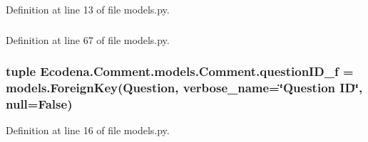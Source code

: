 Definition at line 13 of file models.py.

\hypertarget{class_ecodena_1_1_comment_1_1models_1_1_comment_a7185724458c06c0810da5aa79ddb222b}{
\subsubsection[{questionID\_\-f}]{}}
\label{d9/d86/class_ecodena_1_1_comment_1_1models_1_1_comment_a7185724458c06c0810da5aa79ddb222b}


Definition at line 67 of file models.py.

\hypertarget{class_ecodena_1_1_comment_1_1models_1_1_comment_a2c6b11a35fd421d384666c0b79a20c47}{
\subsubsection[{questionID\_\-f}]{\setlength{\rightskip}{0pt plus 5cm}tuple {\bf Ecodena.Comment.models.Comment.questionID\_\-f} = models.ForeignKey({\bf Question}, verbose\_\-name=\char`\"{}Question ID\char`\"{}, null=False)}}
\label{d9/d86/class_ecodena_1_1_comment_1_1models_1_1_comment_a2c6b11a35fd421d384666c0b79a20c47}


Definition at line 16 of file models.py.

\hypertarget{class_ecodena_1_1_comment_1_1models_1_1_comment_ad01a59e4f30cca2bde7b205e47091ffc}{
\subsubsection[{reportingUserID\_\-f}]{}}
\label{d9/d86/class_ecodena_1_1_comment_1_1models_1_1_comment_ad01a59e4f30cca2bde7b205e47091ffc}


